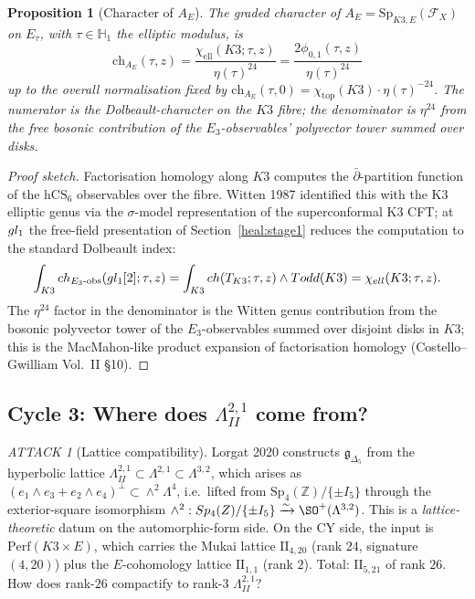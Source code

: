 \documentclass[11pt]{amsart}
\providecommand{\Z}{\mathbb{Z}}
\providecommand{\cF}{\mathcal{F}}
\providecommand{\hCS}{\mathrm{hCS}}
\providecommand{\Perf}{\mathrm{Perf}}
\providecommand{\gDelta}{\mathfrak{g}_{\Delta_5}}
\providecommand{\Lat}{\Lambda}
\providecommand{\dbar}{\bar{\partial}}
\providecommand{\Sp}{\mathrm{Sp}}
\theoremstyle{plain}
\newtheorem{proposition}[theorem]{Proposition}
\theoremstyle{definition}
\theoremstyle{remark}
\newtheorem*{attack}{ATTACK}
\begin{document}
\begin{proposition}[Character of $A_E$]
\label{prop:character-AE}
The graded character of $A_E=\Sp_{K3,E}(\cF_X)$ on $E_\tau$, with
$\tau\in\mathbb{H}_1$ the elliptic modulus, is
\[
\mathrm{ch}_{A_E}(\tau,z)
= \frac{\chi_{\mathrm{ell}}(K3;\tau,z)}{\eta(\tau)^{24}}
= \frac{2\phi_{0,1}(\tau,z)}{\eta(\tau)^{24}}
\]
up to the overall normalisation fixed by $\mathrm{ch}_{A_E}(\tau,0)=
\chi_{\mathrm{top}}(K3)\cdot\eta(\tau)^{-24}$. The numerator is the
Dolbeault-character on the $K3$ fibre; the denominator is $\eta^{24}$
from the free bosonic contribution of the $E_3$-observables' polyvector
tower summed over disks.
\end{proposition}

\begin{proof}[Proof sketch]
Factorisation homology along $K3$ computes the $\dbar$-partition
function of the $\hCS_6$ observables over the fibre. Witten 1987
identified this with the K3 elliptic genus via the $\sigma$-model
representation of the superconformal K3 CFT; at $gl_1$ the free-field
presentation of Section~\ref{heal:stage1} reduces the computation to the
standard Dolbeault index:
\[
\int_{K3}ch_{E_3\text{-obs}}(gl_1[2];\tau,z) =
\int_{K3}ch(T_{K3};\tau,z)\wedge Todd(K3) =
\chi_{ell}(K3;\tau,z).
\]
The $\eta^{24}$ factor in the denominator is the Witten genus
contribution from the bosonic polyvector tower of the $E_3$-observables
summed over disjoint disks in $K3$; this is the MacMahon-like product
expansion of factorisation homology (Costello--Gwilliam Vol.~II \S10).
\end{proof}

\subsection{Cycle 3: Where does $\Lat^{2,1}_{II}$ come from?}

\begin{attack}[Lattice compatibility]
Lorgat 2020 constructs $\gDelta$ from the hyperbolic lattice
$\Lat^{2,1}_{II}\subset\Lat^{2,1}\subset\Lat^{3,2}$, which arises as
$(e_1\wedge e_3 + e_2\wedge e_4)^\perp\subset\wedge^2\Lat^4$, i.e.\
lifted from $\Sp_4(\Z)/\{\pm I_5\}$ through the exterior-square
isomorphism $\wedge^2:\Sp_4(\Z)/\{\pm I_5\}\xrightarrow{\sim}
\SO^+(\Lat^{3,2})$. This is a \emph{lattice-theoretic} datum on the
automorphic-form side. On the CY side, the input is $\Perf(K3\times E)$,
which carries the Mukai lattice $\mathrm{II}_{4,20}$ (rank $24$,
signature $(4,20)$) plus the $E$-cohomology lattice $\mathrm{II}_{1,1}$
(rank $2$). Total: $\mathrm{II}_{5,21}$ of rank $26$. How does rank-$26$
compactify to rank-$3$ $\Lat^{2,1}_{II}$?
\end{attack}
\end{document}
